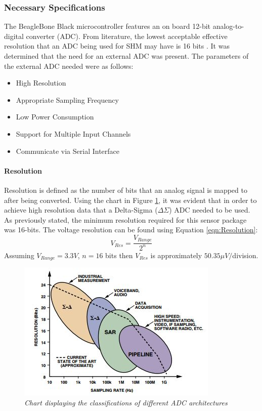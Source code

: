 \subsubsection{Necessary Specifications}
\label{sec:ADC_Parameters}
\indent The BeagleBone Black microcontroller features an on board 12-bit analog-to-digital converter (ADC). From literature, the lowest acceptable
effective resolution that an ADC being used for SHM may have is 16 bits\cite{Cunha_Caetano} \cite{JangSWMWSS}. It was determined that the need for an
external ADC was present. The parameters of the external ADC needed were as follows:
\begin{itemize}
\item High Resolution
\item Appropriate Sampling Frequency
\item Low Power Consumption 
\item Support for Multiple Input Channels
\item Communicate via Serial Interface
\end{itemize}
\paragraph{Resolution}
\label{sec:adc_res}
\indent Resolution is defined as the number of bits that an analog signal is mapped to after being converted\cite{MusaJouaneh:2013}. Using the chart in
Figure \ref{fig:ADC_Comp_Chart}, it was evident that in order to achieve high resolution data that a Delta-Sigma ($\Delta\Sigma$) ADC needed to be used.\\
\indent As previously stated, the minimum resolution required for this sensor package was 16-bits. The voltage resolution can be found using Equation
\ref{eqn:Resolution}:
\begin{equation}
\label{eqn:Resolution}
V_{Res} = \frac{V_{Range}}{2^{n}}
\end{equation}
Assuming $V_{Range}=3.3V$, $n=16$ bits then $V_{Res}$ is approximately $50.35\mu V/$division. 

\begin{figure}[H]
\centering
\includegraphics[scale=1]{KIRBY_Images/ADC_Comp_Chart.jpg}
\caption{\textit{Chart displaying the classifications of different ADC architectures \cite{WaltKester:2005}}}
\label{fig:ADC_Comp_Chart}
\end{figure}
%
